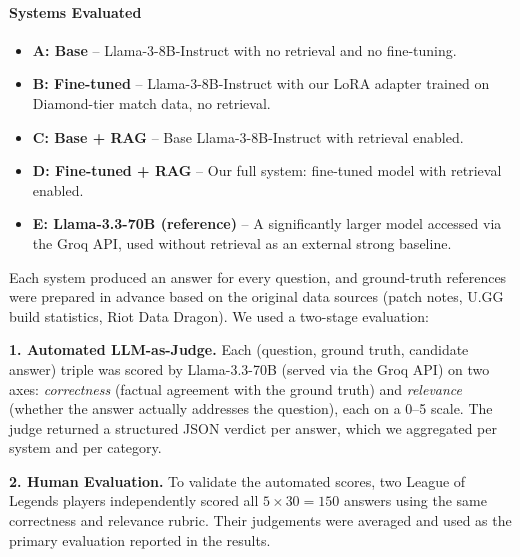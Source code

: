 \documentclass[fleqn,moreauthors,10pt]{ds_report}
\begin{document}
\paragraph{Systems Evaluated} \begin{itemize} \item \textbf{A: Base} -- Llama-3-8B-Instruct with no retrieval and no fine-tuning. \item \textbf{B: Fine-tuned} -- Llama-3-8B-Instruct with our LoRA adapter trained on Diamond-tier match data, no retrieval. \item \textbf{C: Base + RAG} -- Base Llama-3-8B-Instruct with retrieval enabled. \item \textbf{D: Fine-tuned + RAG} -- Our full system: fine-tuned model with retrieval enabled. \item \textbf{E: Llama-3.3-70B (reference)} -- A significantly larger model accessed via the Groq API, used without retrieval as an external strong baseline. \end{itemize}

Each system produced an answer for every question, and ground-truth references were prepared in advance based on the original data sources (patch notes, U.GG build statistics, Riot Data Dragon). We used a two-stage evaluation:

\textbf{1. Automated LLM-as-Judge.} Each (question, ground truth, candidate answer) triple was scored by Llama-3.3-70B (served via the Groq API) on two axes: \textit{correctness} (factual agreement with the ground truth) and \textit{relevance} (whether the answer actually addresses the question), each on a 0--5 scale. The judge returned a structured JSON verdict per answer, which we aggregated per system and per category.

\textbf{2. Human Evaluation.} To validate the automated scores, two League of Legends players independently scored all $5 \times 30 = 150$ answers using the same correctness and relevance rubric. Their judgements were averaged and used as the primary evaluation reported in the results.


\end{document}
